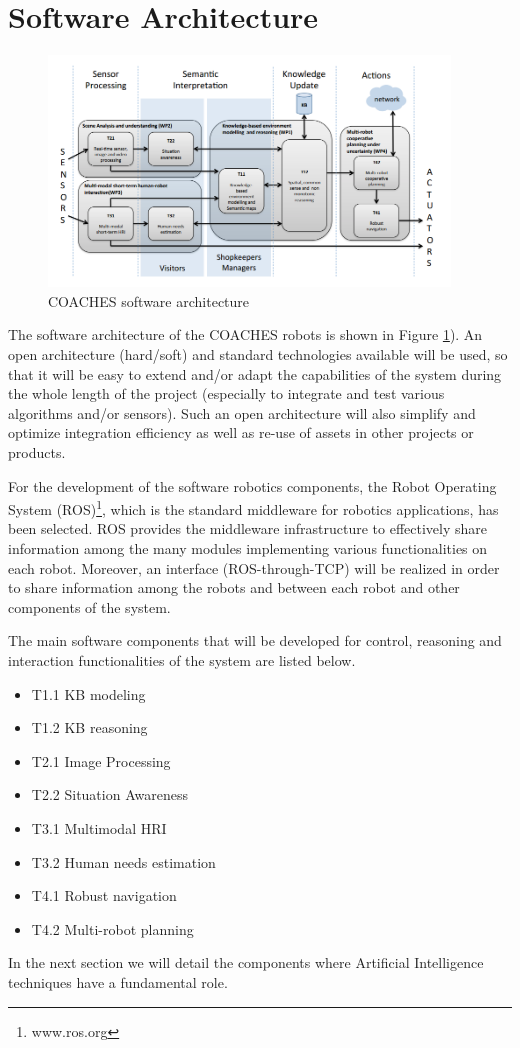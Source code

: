 \section{Software Architecture}

\begin{figure}
\centering
\includegraphics[width=0.95\textwidth]{fig/COACHES_swarch.png}
\caption{COACHES software architecture}
\label{fig:swarch}
\end{figure}

The software architecture of the COACHES robots is shown in Figure \ref{fig:swarch}).
An open architecture (hard/soft) and standard technologies available will be used, 
so that it will be easy to extend and/or adapt the capabilities of the system during the whole length of 
the  project  (especially  to  integrate  and  test  various  algorithms  and/or  sensors).  
Such an open architecture will also simplify and optimize integration efficiency as well as re-use of assets in other projects or products. 


For the development of the software robotics components, the Robot Operating System (ROS)\footnote{www.ros.org}, which is the standard middleware for robotics applications, has been selected.
ROS provides the middleware infrastructure to effectively share information among the many modules implementing various functionalities on each robot. Moreover, an interface (ROS-through-TCP) will be realized in order to share information among the robots and between each robot and other components of the system.

The main software components that will be developed for control, reasoning and interaction functionalities of the system are listed below.

\begin{itemize}
\item T1.1 KB modeling
\item T1.2 KB reasoning
\item T2.1 Image Processing
\item T2.2 Situation Awareness
\item T3.1 Multimodal HRI
\item T3.2 Human needs estimation
\item T4.1 Robust navigation %
\item T4.2 Multi-robot planning
\end{itemize}

In the next section we will detail the components where Artificial Intelligence techniques have a fundamental role.



